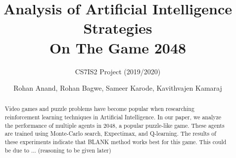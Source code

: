 \documentclass{svproc}
\begin{document}
    \mainmatter
    \title{Analysis of Artificial Intelligence Strategies\\On The Game 2048
    }
    \subtitle{CS7IS2 Project (2019/2020)}
    \author{Rohan Anand, Rohan Bagwe, Sameer Karode, Kavithvajen Kamaraj}


    \maketitle

    \begin{abstract}
        Video games and puzzle problems have become popular when researching reinforcement learning techniques in Artificial Intelligence. In our paper, we analyze the performance of multiple agents in 2048, a popular puzzle-like game. These agents are trained using Monte-Carlo search, Expectimax, and Q-learning. The results of these experiments indicate that BLANK method works best for this game. This could be due to ... (reasoning to be given later)
    \end{abstract}
%

\end{document}
